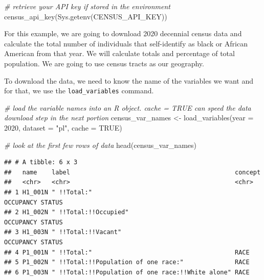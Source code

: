 \documentclass[
]{book}
\newenvironment{Shaded}{\begin{snugshade}}{\end{snugshade}}
\newcommand{\AttributeTok}[1]{\textcolor[rgb]{0.77,0.63,0.00}{#1}}
\newcommand{\CommentTok}[1]{\textcolor[rgb]{0.56,0.35,0.01}{\textit{#1}}}
\newcommand{\ConstantTok}[1]{\textcolor[rgb]{0.00,0.00,0.00}{#1}}
\newcommand{\DecValTok}[1]{\textcolor[rgb]{0.00,0.00,0.81}{#1}}
\newcommand{\FunctionTok}[1]{\textcolor[rgb]{0.00,0.00,0.00}{#1}}
\newcommand{\NormalTok}[1]{#1}
\newcommand{\OtherTok}[1]{\textcolor[rgb]{0.56,0.35,0.01}{#1}}
\newcommand{\StringTok}[1]{\textcolor[rgb]{0.31,0.60,0.02}{#1}}
\begin{document}
\begin{Shaded}
\begin{Highlighting}[]
\CommentTok{\# retrieve your API key if stored in the environment}
\FunctionTok{census\_api\_key}\NormalTok{(}\FunctionTok{Sys.getenv}\NormalTok{(}\StringTok{\textquotesingle{}CENSUS\_API\_KEY\textquotesingle{}}\NormalTok{))}
\end{Highlighting}
\end{Shaded}

For this example, we are going to download 2020 decennial census data and calculate the total number of individuals that self-identify as black or African American from that year. We will calculate totals and percentage of total population. We are going to use census tracts as our geography.

To download the data, we need to know the name of the variables we want and for that, we use the \texttt{load\_variables} command.

\begin{Shaded}
\begin{Highlighting}[]
\CommentTok{\# load the variable names into an R object. cache = TRUE can speed the data download step in the next portion}
\NormalTok{census\_var\_names }\OtherTok{\textless{}{-}} \FunctionTok{load\_variables}\NormalTok{(}\AttributeTok{year =} \DecValTok{2020}\NormalTok{, }\AttributeTok{dataset =} \StringTok{"pl"}\NormalTok{, }\AttributeTok{cache =} \ConstantTok{TRUE}\NormalTok{)}
\end{Highlighting}
\end{Shaded}

\begin{Shaded}
\begin{Highlighting}[]
\CommentTok{\# look at the first few rows of data}
\FunctionTok{head}\NormalTok{(census\_var\_names)}
\end{Highlighting}
\end{Shaded}

\begin{verbatim}
## # A tibble: 6 x 3
##   name    label                                             concept         
##   <chr>   <chr>                                             <chr>           
## 1 H1_001N " !!Total:"                                       OCCUPANCY STATUS
## 2 H1_002N " !!Total:!!Occupied"                             OCCUPANCY STATUS
## 3 H1_003N " !!Total:!!Vacant"                               OCCUPANCY STATUS
## 4 P1_001N " !!Total:"                                       RACE            
## 5 P1_002N " !!Total:!!Population of one race:"              RACE            
## 6 P1_003N " !!Total:!!Population of one race:!!White alone" RACE
\end{verbatim}
\end{document}
